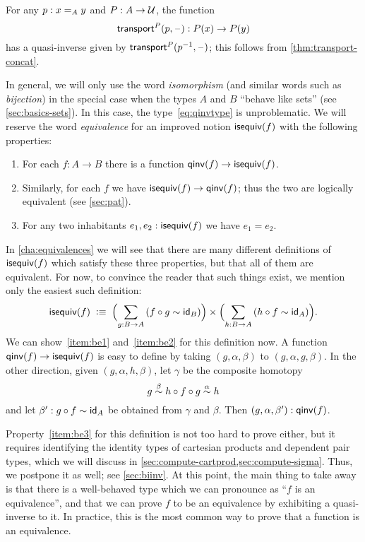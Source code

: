 \begin{eg}\label{thm:transportequiv}
  For any $p:\id[A]xy$ and $P:A\to\type$, the function
  \[\transfib{P}{p}{\blank}:P(x) \to P(y)\]
  has a quasi-inverse given by $\transfib{P}{\opp p}{\blank}$; this follows from \narrowbreak \autoref{thm:transport-concat}.
\end{eg}

In general, we will only use the word \emph{isomorphism}
(and similar words such as \emph{bijection})
in the special case when the types $A$ and $B$ ``behave like sets'' (see \autoref{sec:basics-sets}).
In this case, the type~\eqref{eq:qinvtype} is unproblematic.
We will reserve the word \emph{equivalence} for an improved notion $\isequiv (f)$ with the following properties:%
\begin{enumerate}
\item For each $f:A\to B$ there is a function $\qinv(f) \to \isequiv (f)$.\label{item:be1}
\item Similarly, for each $f$ we have $\isequiv (f) \to \qinv(f)$; thus the two are logically equivalent (see \autoref{sec:pat}).\label{item:be2}
\item For any two inhabitants $e_1,e_2:\isequiv(f)$ we have $e_1=e_2$.\label{item:be3}
\end{enumerate}
In \autoref{cha:equivalences} we will see that there are many different definitions of $\isequiv(f)$ which satisfy these three properties, but that all of them are equivalent.
For now, to convince the reader that such things exist, we mention only the easiest such definition:
\begin{equation}\label{eq:isequiv-invertible}
  \isequiv(f) \;\defeq\;
  \Parens{\sm{g:B\to A} (f\circ g \htpy \idfunc[B])}
  \times
  \Parens{\sm{h:B\to A} (h\circ f \htpy \idfunc[A])}.
\end{equation}
We can show~\ref{item:be1} and~\ref{item:be2} for this definition now.
A function $\qinv(f) \to \isequiv (f)$ is easy to define by taking $(g,\alpha,\beta)$ to $(g,\alpha,g,\beta)$.
In the other direction, given $(g,\alpha,h,\beta)$, let $\gamma$ be the composite homotopy
\[ g \overset{\beta}{\htpy} h\circ f\circ g \overset{\alpha}{\htpy} h \]
and let $\beta':g\circ f\htpy \idfunc[A]$ be obtained from $\gamma$ and $\beta$.
Then $(g,\alpha,\beta'):\qinv(f)$.

Property~\ref{item:be3} for this definition is not too hard to prove either, but it requires identifying the identity types of cartesian products and dependent pair types, which we will discuss in \autoref{sec:compute-cartprod,sec:compute-sigma}.
Thus, we postpone it as well; see \autoref{sec:biinv}.
At this point, the main thing to take away is that there is a well-behaved type which we can pronounce as ``$f$ is an equivalence'', and that we can prove $f$ to be an equivalence by exhibiting a quasi-inverse to it.
In practice, this is the most common way to prove that a function is an equivalence.

